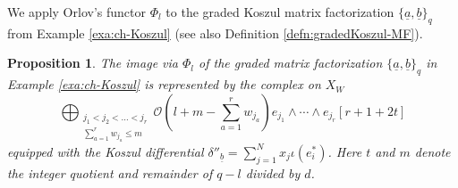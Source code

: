 \documentclass[11pt]{amsart}
\newtheorem{pro}[thm]{Proposition} %
\theoremstyle{definition} %
\theoremstyle{remark} %
\newcommand{\cO}{\mathcal{O}}
\newcommand{\ua}{\underline{a}}
\newcommand{\ub}{\underline{b}}
\begin{document}
We apply Orlov's functor $\Phi_l$ to 
the graded Koszul matrix factorization $\{\ua,\ub\}_q$  
from Example \ref{exa:ch-Koszul}  
(see also Definition \ref{defn:gradedKoszul-MF}). 
\begin{pro}
\label{pro:OrlovKoszul} 
The image via $\Phi_l$ of the graded matrix factorization 
$\{\ua,\ub\}_q$ in Example \ref{exa:ch-Koszul} 
is represented by the complex on $X_W$ 
\begin{equation*}
\bigoplus_{\substack{{j_1<j_2<\dots<j_r}\\ 
\sum_{a=1}^r w_{j_a}\le m}} 
\cO\left(l+ m - \textstyle
\sum_{a=1}^r w_{j_a}\right) e_{j_1}\wedge \cdots \wedge e_{j_r} 
\left[r + 1 +  2 t \right]  
\end{equation*}  
equipped with the Koszul differential 
$\delta''_{\ub} = \sum_{j=1}^N x_j \iota(e_i^*)$.  
Here $t$ and $m$ denote the integer quotient 
and remainder of $q-l$ divided by $d$. 
\end{pro}
\end{document}
